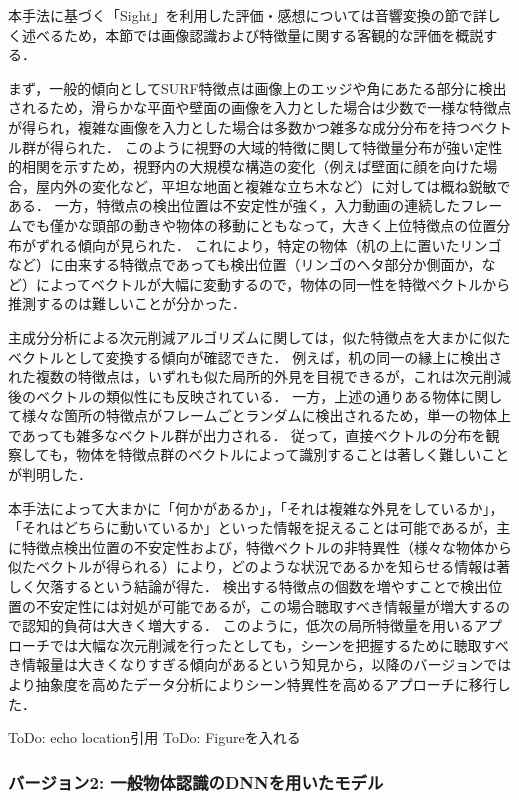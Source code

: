本手法に基づく「Sight」を利用した評価・感想については音響変換の節で詳しく述べるため，本節では画像認識および特徴量に関する客観的な評価を概説する．

まず，一般的傾向としてSURF特徴点は画像上のエッジや角にあたる部分に検出されるため，滑らかな平面や壁面の画像を入力とした場合は少数で一様な特徴点が得られ，複雑な画像を入力とした場合は多数かつ雑多な成分分布を持つベクトル群が得られた．
このように視野の大域的特徴に関して特徴量分布が強い定性的相関を示すため，視野内の大規模な構造の変化（例えば壁面に顔を向けた場合，屋内外の変化など，平坦な地面と複雑な立ち木など）に対しては概ね鋭敏である．
一方，特徴点の検出位置は不安定性が強く，入力動画の連続したフレームでも僅かな頭部の動きや物体の移動にともなって，大きく上位特徴点の位置分布がずれる傾向が見られた．
これにより，特定の物体（机の上に置いたリンゴなど）に由来する特徴点であっても検出位置（リンゴのヘタ部分か側面か，など）によってベクトルが大幅に変動するので，物体の同一性を特徴ベクトルから推測するのは難しいことが分かった．

主成分分析による次元削減アルゴリズムに関しては，似た特徴点を大まかに似たベクトルとして変換する傾向が確認できた．
例えば，机の同一の縁上に検出された複数の特徴点は，いずれも似た局所的外見を目視できるが，これは次元削減後のベクトルの類似性にも反映されている．
一方，上述の通りある物体に関して様々な箇所の特徴点がフレームごとランダムに検出されるため，単一の物体上であっても雑多なベクトル群が出力される．
従って，直接ベクトルの分布を観察しても，物体を特徴点群のベクトルによって識別することは著しく難しいことが判明した．

本手法によって大まかに「何かがあるか」，「それは複雑な外見をしているか」，「それはどちらに動いているか」といった情報を捉えることは可能であるが，主に特徴点検出位置の不安定性および，特徴ベクトルの非特異性（様々な物体から似たベクトルが得られる）により，どのような状況であるかを知らせる情報は著しく欠落するという結論が得た．
検出する特徴点の個数を増やすことで検出位置の不安定性には対処が可能であるが，この場合聴取すべき情報量が増大するので認知的負荷は大きく増大する．
このように，低次の局所特徴量を用いるアプローチでは大幅な次元削減を行ったとしても，シーンを把握するために聴取すべき情報量は大きくなりすぎる傾向があるという知見から，以降のバージョンではより抽象度を高めたデータ分析によりシーン特異性を高めるアプローチに移行した．

ToDo: echo location引用
ToDo: Figureを入れる


\subsubsection{バージョン2: 一般物体認識のDNNを用いたモデル}

